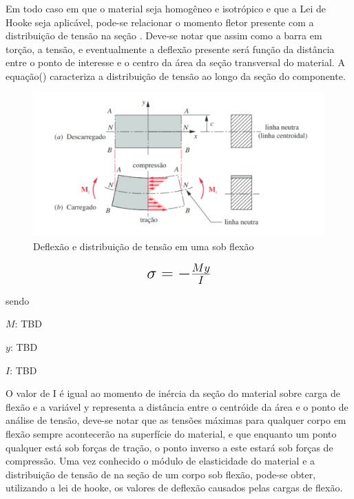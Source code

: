 Em todo caso em que o material seja homogêneo e isotrópico e que a Lei de Hooke seja aplicável, pode-se relacionar o momento fletor presente com a distribuição de tensão na seção \autocite{Hibbeler2010}. Deve-se notar que assim como a barra em torção, a tensão, e eventualmente a deflexão presente será função da distância entre o ponto de interesse e o centro da área da seção transversal do material. A equação() caracteriza a distribuição de tensão ao longo da seção do componente.

\begin{figure}[htb]
	\caption{\label{fig:1070} Deflexão e distribuição de tensão em uma sob flexão}
	\begin{center}
		\includegraphics[width=\textwidth]{pictures/1070.png}
	\end{center}
\end{figure}

\begin{equation}\label{eq:Eq_200}%
\mbox{\fontsize{17.28}{21.6}\selectfont\( %
\sigma = - \frac{My}{I}
\)} %
\end{equation}

sendo

$M$: TBD

$y$: TBD

$I$: TBD

\hfill

O valor de I é igual ao momento de inércia da seção do material sobre carga de flexão e a variável y representa a distância entre o centróide da área e o ponto de análise de tensão, deve-se notar que as tensões máximas para qualquer corpo em flexão sempre acontecerão na superfície do material, e que enquanto um ponto qualquer está sob forças de tração, o ponto inverso a este estará sob forças de compressão. Uma vez conhecido o módulo de elasticidade do material e a distribuição de tensão de na seção de um corpo sob flexão, pode-se obter, utilizando a lei de hooke, os valores de deflexão causados pelas cargas de flexão.


